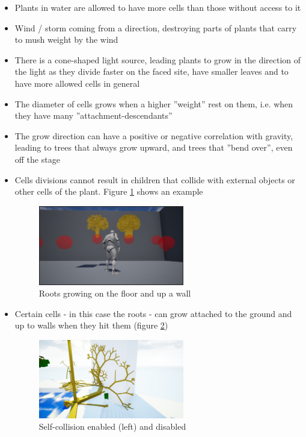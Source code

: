 \documentclass[11pt]{scrartcl}
\begin{document}
\begin{itemize}
	\item Plants in water are allowed to have more cells than those without access to it
	\item Wind / storm coming from a direction, destroying parts of plants that carry to mush weight by the wind
	\item There is a cone-shaped light source, leading plants to grow in the direction of the light as they divide faster on the faced site, have smaller leaves and to have more allowed cells in general
	\item The diameter of cells grows when a higher ''weight'' rest on them, i.e. when they have many ''attachment-descendants''
	\item The grow direction can have a positive or negative correlation with gravity, leading to trees that always grow upward, and trees that ''bend over'', even off the stage
	\item Cells divisions cannot result in children that collide with external objects or other cells of the plant. Figure \ref{fig:SelfCollision} shows an example
		\begin{figure} 
 		 \centering
 		    \includegraphics[width=0.6\textwidth]{SS_SelfCollision.png}
 		 \caption{Roots growing on the floor and up a wall}
 		 \label{fig:SelfCollision}
	\end{figure}
	\item Certain cells - in this case the roots - can grow attached to the ground and up to walls when they hit them (figure \ref{fig:RootsOnFloor})
	\begin{figure} 
 		 \centering
 		    \includegraphics[width=0.6\textwidth]{SS_Roots.png}
 		 \caption{Self-collision enabled (left) and disabled}
 		 \label{fig:RootsOnFloor}
	\end{figure}
\end{itemize}
\end{document}
